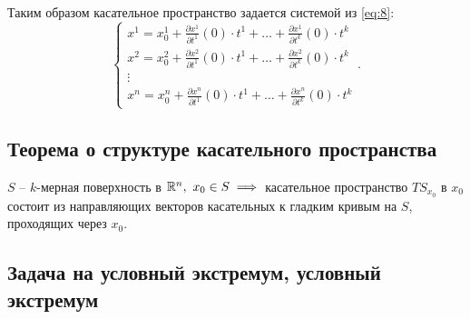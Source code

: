 \begin{definition}
    Таким образом касательное пространство задается системой из \ref{eq:8}:
    \[
        \left\{\begin{array}{l}
            x^1 = x^1_0 + \frac{\partial x^1}{\partial t^1} (0)\cdot t^1 + \ldots + \frac{\partial x^1}{\partial t^k}(0)\cdot t^k \\
            x^2 = x^2_0 + \frac{\partial x^2}{\partial t^1} (0)\cdot t^1 + \ldots + \frac{\partial x^2}{\partial t^k}(0)\cdot t^k \\
            \vdots                                                                                                                \\
            x^n = x^n_0 + \frac{\partial x^n}{\partial t^1} (0)\cdot t^1 + \ldots + \frac{\partial x^n}{\partial t^k}(0)\cdot t^k
        \end{array}\right..
    \]
\end{definition}

\subsection{Теорема о структуре касательного пространства}

\begin{theorem}\label{theorem:2}
    $S$ -- $k$-мерная поверхность в $\mathbb{R}^n, \ x_0 \in S \implies $ касательное пространство $TS_{x_0}$ в $x_0$ состоит из направляющих векторов касательных к гладким кривым на $S$, проходящих через $x_0$.
\end{theorem}

\subsection{Задача на условный экстремум, условный экстремум}

